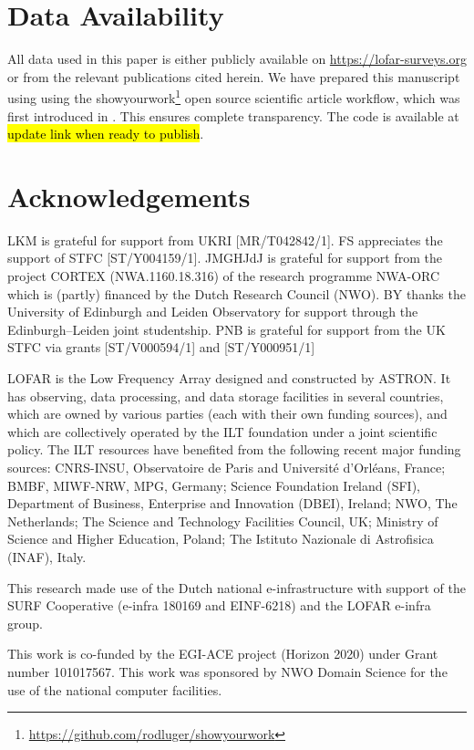 \documentclass[usenatbib,fleqn,letters]{mnras}
\begin{document}
\vspace{-0.5in}

\section*{Data Availability}
All data used in this paper is either publicly available on \href{https://lofar-surveys.org}{https://lofar-surveys.org} or from the relevant publications cited herein. We have prepared this manuscript using using the showyourwork\footnote{ \href{https://github.com/rodluger/showyourwork}{https://github.com/rodluger/showyourwork}} open source scientific article workflow, which was first introduced in \cite{luger_mapping_2021}. This ensures complete transparency. The code is available at \hl{update link when ready to publish}. 

\section*{Acknowledgements}
LKM is grateful for support from UKRI [MR/T042842/1]. 
FS appreciates the support of STFC [ST/Y004159/1]. 
JMGHJdJ is grateful for support from the project CORTEX (NWA.1160.18.316) of the research programme NWA-ORC which is (partly) financed by the Dutch Research Council (NWO). 
BY thanks the University of Edinburgh and Leiden Observatory for support through the Edinburgh–Leiden joint studentship.
PNB is grateful for support from the UK STFC via grants [ST/V000594/1] and [ST/Y000951/1]

LOFAR is the Low Frequency Array designed and constructed by ASTRON. It has observing, data processing, and data storage facilities in several countries, which are owned by various parties (each with their own funding sources), and which are collectively operated by the ILT foundation under a joint scientific policy. The ILT resources have benefited from the following recent major funding sources: CNRS-INSU, Observatoire de Paris and Université d'Orléans, France; BMBF, MIWF-NRW, MPG, Germany; Science Foundation Ireland (SFI), Department of Business, Enterprise and Innovation (DBEI), Ireland; NWO, The Netherlands; The Science and Technology Facilities Council, UK; Ministry of Science and Higher Education, Poland; The Istituto Nazionale di Astrofisica (INAF), Italy. 

This research made use of the Dutch national e-infrastructure with support of the SURF Cooperative (e-infra 180169 and EINF-6218) and the LOFAR e-infra group. 

This work is co-funded by the EGI-ACE project (Horizon 2020) under Grant number 101017567. This work was sponsored by NWO Domain Science for the use of the national computer facilities.
\end{document}
